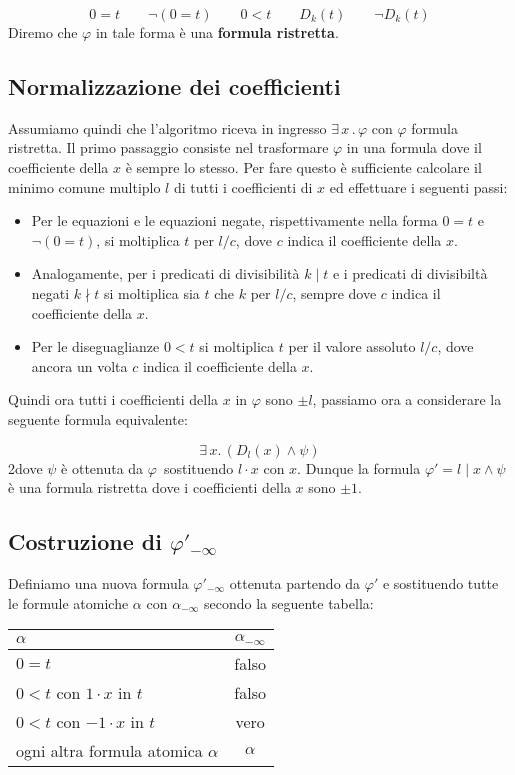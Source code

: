 \documentclass[11pt,letterpaper,twoside]{article}
\begin{document}
$$0=t \qquad \lnot(0=t) \qquad 0<t \qquad D_k(t) \qquad \lnot D_k(t)$$
Diremo che $\varphi$ in tale forma è una \textbf{formula ristretta}.

\subsection{Normalizzazione dei coefficienti} Assumiamo quindi che l'algoritmo
riceva in ingresso $\exists \, x \, . \, \varphi$ con $\varphi$ formula
ristretta. Il primo passaggio consiste nel trasformare $\varphi$ in una formula
dove il coefficiente della $x$ è sempre lo stesso. Per fare questo è sufficiente
calcolare il minimo comune multiplo $l$ di tutti i coefficienti di $x$ ed
effettuare i seguenti passi:

\begin{itemize}
  \item Per le equazioni e le equazioni negate, rispettivamente nella forma
$0=t$ e $\lnot (0=t)$, si moltiplica $t$ per $l/c$, dove $c$ indica il
coefficiente della $x$.
  \item Analogamente, per i predicati di divisibilit\`a $k \mid t$ e i predicati
di divisibilt\`a negati $k \nmid t$ si moltiplica sia $t$ che $k$ per $l/c$,
sempre dove $c$ indica il coefficiente della $x$.
  \item Per le diseguaglianze $0<t$ si moltiplica $t$ per il valore assoluto
$l/c$, dove ancora un volta $c$ indica il coefficiente della $x$.
\end{itemize}

Quindi ora tutti i coefficienti della $x$ in $\varphi$ sono $\pm l$, passiamo
ora a considerare la seguente formula equivalente:

$$ \exists \, x . \, (D_l(x) \land \psi)  $$
2dove $\psi$ è ottenuta da $\varphi$\ sostituendo $l \cdot x$ con $x$.  Dunque la
formula $\varphi' = l \mid x \land \psi$ è una formula ristretta dove i
coefficienti della $x$ sono $\pm 1$.

\subsection{Costruzione di $\varphi'_{- \infty}$} Definiamo una nuova formula
$\varphi'_{- \infty}$ ottenuta partendo da $\varphi'$ e sostituendo tutte le
formule atomiche $\alpha$ con $\alpha_{- \infty}$ secondo la seguente tabella:

\begin{center}
  \begin{tabular}{ l | c }
    $\alpha$ & $\alpha_{- \infty}$ \\ \hline
    $0=t$ & falso \\
    $0 < t$ con $1 \cdot x$ in $t$ & falso \\
    $0 < t$ con $-1 \cdot x$ in $t$ & vero \\
    ogni altra formula atomica $\alpha$ & $\alpha$ \\
  \end{tabular}
\end{center}
\end{document}
